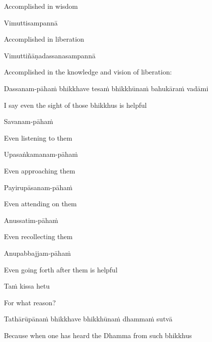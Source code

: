 \begin{cprenglish}
  Accomplished in wisdom
\end{cprenglish}

Vimuttisampannā

\begin{cprenglish}
  Accomplished in liberation
\end{cprenglish}

Vimuttiñāṇadassanasampannā

\begin{cprenglish}
  Accomplished in the knowledge and vision of liberation:
\end{cprenglish}

Dassanam-pāhaṁ bhikkhave tesaṁ bhikkhūnaṁ bahukāraṁ vadāmi

\begin{cprenglish}
  I say even the sight of those bhikkhus is helpful
\end{cprenglish}

Savanam-pāhaṁ

\begin{cprenglish}
  Even listening to them
\end{cprenglish}

Upasaṅkamanam-pāhaṁ

\begin{cprenglish}
  Even approaching them
\end{cprenglish}

Payirupāsanam-pāhaṁ

\begin{cprenglish}
  Even attending on them
\end{cprenglish}

Anussatim-pāhaṁ

\begin{cprenglish}
  Even recollecting them
\end{cprenglish}

Anupabbajjam-pāhaṁ

\begin{cprenglish}
  Even going forth after them is helpful
\end{cprenglish}

Taṁ kissa hetu

\begin{cprenglish}
  For what reason?
\end{cprenglish}

Tathārūpānaṁ bhikkhave bhikkhūnaṁ dhammaṁ sutvā

\begin{cprenglish}
  Because when one has heard the Dhamma from such bhikkhus
\end{cprenglish}

